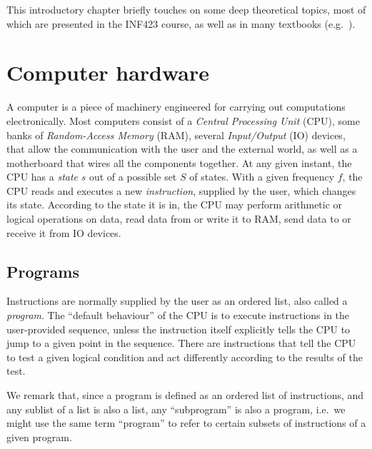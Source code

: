 \documentclass[a4paper]{book}
\theoremstyle{changebreak}                %
\begin{document}
This introductory chapter briefly touches on some deep theoretical
topics, most of which are presented in the INF423 course, as well as
in many textbooks (e.g.~\cite{minsky}).

\section{Computer hardware}
\label{s:computation:practice}
A computer is a piece of machinery engineered for carrying out
computations electronically. Most computers consist of a {\it Central
  Processing Unit} (CPU), some banks of {\it Random-Access
  Memory} (RAM), several {\it Input/Output} (IO)
devices, that allow the communication with the user and the external
world, as well as a motherboard that wires all the components
together. At any given instant, the CPU has a {\it state}
$s$ out of a possible set $S$ of states. With a given frequency $f$,
the CPU reads and executes a new {\it instruction},
supplied by the user, which changes its state. According to the state
it is in, the CPU may perform arithmetic or logical operations on
data, read data from or write it to RAM, send data to or receive it
from IO devices.

\subsection{Programs}
\label{s:computation:programs}
Instructions are normally supplied by the user as an ordered list,
also called a {\it program}. The ``default behaviour''
of the CPU is to execute instructions in the user-provided sequence,
unless the instruction itself explicitly tells the CPU to jump to a
given point in the sequence. There are instructions that tell the CPU
to test a given logical condition and act differently according to the
results of the test.

We remark that, since a program is defined as an ordered list of
instructions, and any sublist of a list is also a list, any
``subprogram'' is also a program, i.e.~we might use the same term
``program'' to refer to certain subsets of instructions of a given
program.
\end{document}
